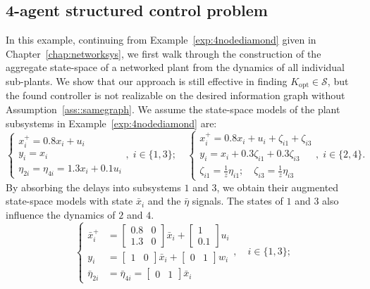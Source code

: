\subsection{4-agent structured control problem}
In this example, continuing from Example~\ref{exp:4nodediamond} given in Chapter~\ref{chap:networksys}, we first walk through the construction of the aggregate state-space of a networked plant from the dynamics of all individual sub-plants. We show that our approach is still effective in finding \(K_\mathrm{opt}\in \mathcal{S}\), but the found controller is not realizable on the desired information graph without Assumption~\ref{ass::samegraph}.
We assume the state-space models of the plant subsystems in Example~\ref{exp:4nodediamond} are:
\begin{equation*}
\begin{cases}
    x_i^+ = 0.8 x_i + u_i \\
    y_i = x_i\\
    \eta_{2i} = \eta_{4i} = 1.3 x_i + 0.1 u_i  
\end{cases},\; i \in \{1,3\};\quad 
\begin{cases}
    x_i^+ = 0.8 x_i + u_i + \zeta_{i1} + \zeta_{i3}\\
    y_i = x_i + 0.3 \zeta_{i1} + 0.3 \zeta_{i3}\\
    \zeta_{i1} = \frac{1}{z} \eta_{i1};\quad \zeta_{i3} = \frac{1}{z} \eta_{i3}
\end{cases},\; i \in \{2,4\}.
\end{equation*}
By absorbing the delays into subsystems \(1\) and \(3\), we obtain their augmented state-space models with state \(\bar{x}_i\) and the \(\bar{\eta}\) signals. The states of \(1\) and \(3\) also influence the dynamics of \(2\) and \(4\). 
\begin{equation*}
\begin{cases}
    \bar{x}_i^+ &= \begin{bmatrix} 0.8 & 0 \\ 1.3 & 0 \end{bmatrix} \bar{x}_i 
    + \begin{bmatrix} 1 \\ 0.1 \end{bmatrix}u_i \\
    y_i &= \begin{bmatrix} 1 & 0 \end{bmatrix} \bar{x}_i + \begin{bmatrix} 0 & 1 \end{bmatrix} w_i\\
    \bar{\eta}_{2i} & = \bar{\eta}_{4i} = \begin{bmatrix} 0 & 1 \end{bmatrix} \bar{x}_i 
\end{cases},\quad i \in \{1,3\};
\end{equation*}
